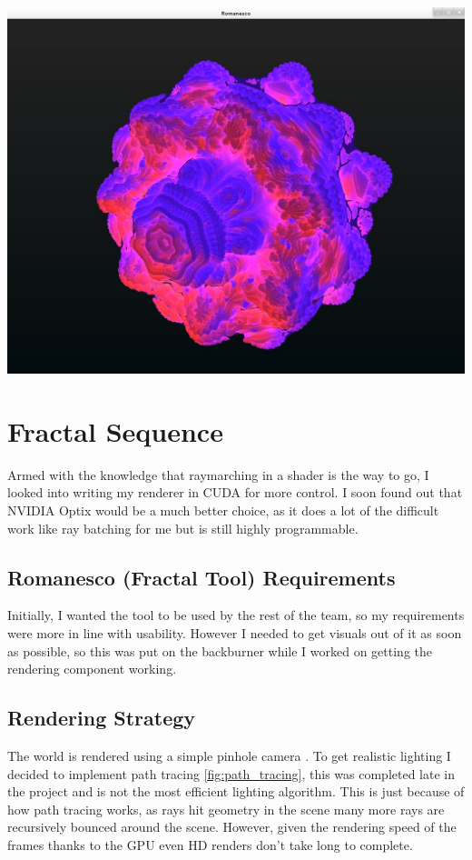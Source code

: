 \documentclass[11pt,a4paper,final,notitlepage]{report}
\begin{document}
\includegraphics[width=\textwidth]{images/gl_bulb}






\chapter{Fractal Sequence}

Armed with the knowledge that raymarching in a shader is the way to go, I looked into writing my renderer in CUDA for more control. I soon found out that NVIDIA Optix would be a much better choice, as it does a lot of the difficult work like ray batching for me but is still highly programmable.

\section{Romanesco (Fractal Tool) Requirements}

Initially, I wanted the tool to be used by the rest of the team, so my requirements were more in line with usability. However I needed to get visuals out of it as soon as possible, so this was put on the backburner while I worked on getting the rendering component working.

\section{Rendering Strategy}
The world is rendered using a simple pinhole camera \cite{pinhole}. To get realistic lighting I decided to implement path tracing \ref{fig:path_tracing}, this was completed late in the project and is not the most efficient lighting algorithm. This is just because of how path tracing works, as rays hit geometry in the scene many more rays are recursively bounced around the scene. However, given the rendering speed of the frames thanks to the GPU even HD renders don't take long to complete.
\end{document}
